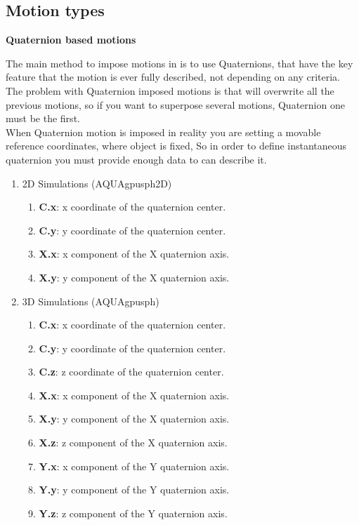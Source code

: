 \subsection{Motion types}
\label{sss:aquagpusph:motions:Types}
%
\begin{center}
\textbf{Quaternion based motions}
\end{center}
%
The main method to impose motions in \NAME is to use Quaternions, that have the key feature that the motion is
ever fully described, not depending on any criteria. The problem with Quaternion imposed motions is that will
overwrite all the previous motions, so if you want to superpose several motions, Quaternion one must be the first.\\
%
When Quaternion motion is imposed in reality you are setting a movable reference coordinates, where object is fixed,
So in order to define instantaneous quaternion you must provide enough data to can describe it.
%
\begin{enumerate}
	\item 2D Simulations (AQUAgpusph2D)
	\begin{enumerate}
		\item \textbf{C.x}: x coordinate of the quaternion center.
		\item \textbf{C.y}: y coordinate of the quaternion center.
		\item \textbf{X.x}: x component of the X quaternion axis.
		\item \textbf{X.y}: y component of the X quaternion axis.
	\end{enumerate}
	\item 3D Simulations (AQUAgpusph)
	\begin{enumerate}
		\item \textbf{C.x}: x coordinate of the quaternion center.
		\item \textbf{C.y}: y coordinate of the quaternion center.
		\item \textbf{C.z}: z coordinate of the quaternion center.
		\item \textbf{X.x}: x component of the X quaternion axis.
		\item \textbf{X.y}: y component of the X quaternion axis.
		\item \textbf{X.z}: z component of the X quaternion axis.
		\item \textbf{Y.x}: x component of the Y quaternion axis.
		\item \textbf{Y.y}: y component of the Y quaternion axis.
		\item \textbf{Y.z}: z component of the Y quaternion axis.
	\end{enumerate}
\end{enumerate}
